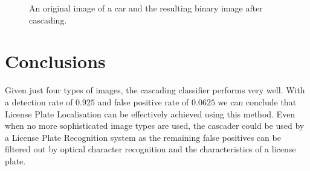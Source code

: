 \documentclass[a4paper,11pt]{article}
\begin{document}
\begin{figure}[!ht]
\centering
{}
\caption{An original image of a car and the resulting binary image after cascading.}
\label{fig:result}
\end{figure}

\section{Conclusions} \label{sec:conc}
Given just four types of images, the cascading classifier performs very well.
With a detection rate of $0.925$ and false positive rate of $0.0625$ we can
conclude that License Plate Localisation can be effectively achieved using this
method. Even when no more sophisticated image types are used, the cascader
could be used by a License Plate Recognition system as the remaining false
positives can be filtered out by optical character recognition and the
characteristics of a license plate.
\end{document}
